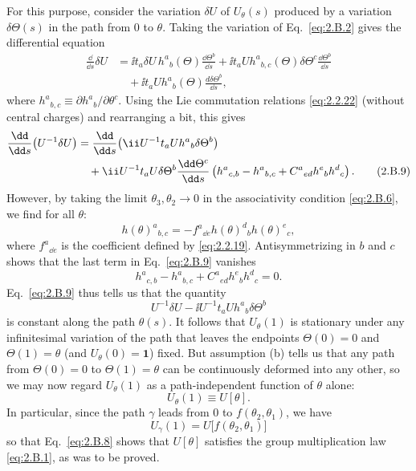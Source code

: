 For this purpose, consider the variation $\delta U$ of $U_{\theta}(s)$
produced by a variation $\delta\Theta(s)$ in the path from 0 to $\theta$.
Taking the variation of Eq.~\eqref{eq:2.B.2} gives the differential equation
\begin{align*}
  \frac{\dd}{\dd s}\delta U
  &=\ii t_a\delta U\,h^a{}_{b}(\Theta)\frac{\dd\Theta^b}{\dd s}
    +\ii t_aU h^a{}_{b,c}(\Theta)\delta\Theta^c
      \frac{\dd\Theta^b}{\dd s}\\
  &\quad+\ii t_aU h^a{}_{b}(\Theta)\frac{d\delta\Theta^b}{\dd s},
\end{align*}
where $h^a{}_{b,c}\equiv\partial h^a{}_{b}/\partial\theta^c$. Using the
Lie commutation relations \eqref{eq:2.2.22} (without central charges) and rearranging
a bit, this gives
\begin{align}
  \frac{\dd}{\dd s}\bigl(U^{-1}\delta U\bigr)
  &=\frac{\dd}{\dd s}\bigl(\ii U^{-1}t_aU h^a{}_{b}\delta\Theta^b\bigr)
  \notag\\
  &\quad+\ii U^{-1}t_aU\delta\Theta^b\frac{\dd\Theta^c}{\dd s}
    \left(h^a{}_{c,b}-h^a{}_{b,c}
      +C^a{}_{ed}h^e{}_{b}h^d{}_{c}\right).
  \tag{2.B.9}\label{eq:2.B.9}
\end{align}
However, by taking the limit $\theta_3,\theta_2\to0$ in the associativity
condition \eqref{eq:2.B.6}, we find for all $\theta$:
\begin{equation}
  h(\theta)^a{}_{b,c}
    =-f^a{}_{\dd e}h(\theta)^d{}_{b}h(\theta)^e{}_{c},
  \tag{2.B.10}\label{eq:2.B.10}
\end{equation}
where $f^a{}_{\dd e}$ is the coefficient defined by \eqref{eq:2.2.19}.
Antisymmetrizing in $b$ and $c$ shows that the last term in Eq.~\eqref{eq:2.B.9}
vanishes
\begin{equation}
  h^a{}_{c,b}-h^a{}_{b,c}
    +C^a{}_{ed}h^e{}_{b}h^d{}_{c}=0.
  \tag{2.B.11}\label{eq:2.B.11}
\end{equation}
Eq.~\eqref{eq:2.B.9} thus tells us that the quantity
\begin{equation*}
  U^{-1}\delta U-\ii U^{-1}t_aU h^a{}_{b}\delta\Theta^b
\end{equation*}
is constant along the path $\theta(s)$. It follows that $U_{\theta}(1)$ is
stationary under any infinitesimal variation of the path that leaves the
endpoints $\Theta(0)=0$ and $\Theta(1)=\theta$ (and
$U_{\theta}(0)=\mathbf{1}$) fixed. But assumption (b) tells us that any path
from $\Theta(0)=0$ to $\Theta(1)=\theta$ can be continuously deformed into
any other, so we may now regard $U_{\theta}(1)$ as a path-independent
function of $\theta$ alone:
\begin{equation}
  U_{\theta}(1)\equiv U[\theta].
  \tag{2.B.12}\label{eq:2.B.12}
\end{equation}
In particular, since the path $\gamma$ leads from 0 to
$f(\theta_2,\theta_1)$, we have
\begin{equation}
  U_{\gamma}(1)=U\bigl[f(\theta_2,\theta_1)\bigr]
  \tag{2.B.13}\label{eq:2.B.13}
\end{equation}
so that Eq.~\eqref{eq:2.B.8} shows that $U[\theta]$ satisfies the group
multiplication law \eqref{eq:2.B.1}, as was to be proved.

